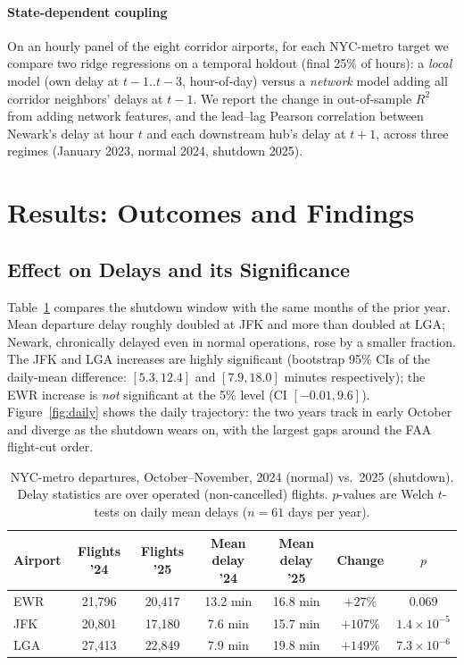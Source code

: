 \documentclass[10pt,journal]{IEEEtran}
\begin{document}
\paragraph{State-dependent coupling}
On an hourly panel of the eight corridor airports, for each NYC-metro target we
compare two ridge regressions on a temporal holdout (final 25\% of hours): a
\emph{local} model (own delay at $t{-}1..t{-}3$, hour-of-day) versus a
\emph{network} model adding all corridor neighbors' delays at $t{-}1$. We report
the change in out-of-sample $R^2$ from adding network features, and the
lead--lag Pearson correlation between Newark's delay at hour $t$ and each
downstream hub's delay at $t{+}1$, across three regimes (January 2023, normal
2024, shutdown 2025).

\section{Results: Outcomes and Findings}
\label{sec:results}

\subsection{Effect on Delays and its Significance}
\label{sec:res-effect}
Table~\ref{tab:raw} compares the shutdown window with the same months of the
prior year. Mean departure delay roughly doubled at JFK and more than doubled
at LGA; Newark, chronically delayed even in normal operations, rose by a
smaller fraction. The JFK and LGA increases are highly significant (bootstrap
95\% CIs of the daily-mean difference: $[5.3, 12.4]$ and $[7.9, 18.0]$ minutes
respectively); the EWR increase is \emph{not} significant at the 5\% level (CI
$[-0.01, 9.6]$). Figure~\ref{fig:daily} shows the daily trajectory: the two
years track in early October and diverge as the shutdown wears on, with the
largest gaps around the FAA flight-cut order.

\begin{table}[!t]
\centering
\caption{NYC-metro departures, October--November, 2024 (normal) vs.\ 2025
(shutdown). Delay statistics are over operated (non-cancelled) flights.
$p$-values are Welch $t$-tests on daily mean delays ($n{=}61$ days per year).}
\label{tab:raw}
\begin{tabular}{lcccccc}
\toprule
Airport & Flights '24 & Flights '25 & Mean delay '24 & Mean delay '25 &
Change & $p$ \\
\midrule
EWR & 21{,}796 & 20{,}417 & 13.2 min & 16.8 min & $+27\%$ & $0.069$ \\
JFK & 20{,}801 & 17{,}180 & 7.6 min & 15.7 min & $+107\%$ & $1.4\times10^{-5}$ \\
LGA & 27{,}413 & 22{,}849 & 7.9 min & 19.8 min & $+149\%$ & $7.3\times10^{-6}$ \\
\bottomrule
\end{tabular}
\end{table}
\end{document}
